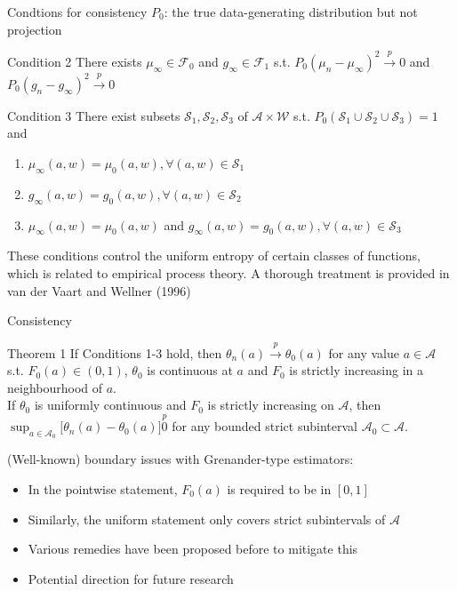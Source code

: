 \documentclass{beamer}
\newcommand{\vs}[1]{\vspace{#1 cm}}
\begin{document}
\begin{frame}{Condtions for consistency}
  $P_0$: the true data-generating distribution but not projection
  \begin{block}{Condition 2}
    There exists $\mu_\infty \in \mathcal{F}_0$ and $g_\infty \in \mathcal{F}_1$ s.t. $P_0(\mu_n -\mu_\infty)^2 \stackrel{p}{\rightarrow} 0$ and $P_0(g_n -g_\infty)^2 \stackrel{p}{\rightarrow} 0$
  \end{block}
  \begin{block}{Condition 3}
    There exist subsets $\mathcal{S}_1, \mathcal{S}_2, \mathcal{S}_3$ of $\mathcal{A} \times \mathcal{W}$ s.t. $P_0(\mathcal{S}_1 \cup \mathcal{S}_2 \cup \mathcal{S}_3)=1$ and
    \begin{enumerate}
      \item $\mu_\infty(a,w) = \mu_0(a,w), \forall (a,w) \in \mathcal{S}_1$
      \item $g_\infty(a,w) = g_0(a,w), \forall (a,w) \in \mathcal{S}_2$
      \item $\mu_\infty(a,w) = \mu_0(a,w)$ and $g_\infty(a,w) = g_0(a,w), \forall (a,w) \in \mathcal{S}_3$
    \end{enumerate}
  \end{block}
  These conditions control the uniform entropy of certain classes of functions, which is related to empirical process theory. A thorough treatment is provided in van der Vaart and Wellner (1996)
\end{frame}

\begin{frame}{Consistency}
  \begin{block}{Theorem 1}
    If Conditions 1-3 hold, then $\theta_n(a) \stackrel{p}{\rightarrow} \theta_0(a)$ for any value $a \in \mathcal{A}$ s.t. $F_0(a) \in (0,1)$, $\theta_0$ is continuous at $a$ and $F_0$ is strictly increasing in a neighbourhood of $a$. \\
    \vs{0.3}
    If $\theta_0$ is uniformly continuous and $F_0$ is strictly increasing on $\mathcal{A}$, then $\sup_{a \in \mathcal{A}_0} \big[ \theta_n(a) -\theta_0(a) \big] \stackrel{p} 0$ for any bounded strict subinterval $\mathcal{A}_0 \subset \mathcal{A}$.
  \end{block}
  (Well-known) boundary issues with Grenander-type estimators:
  \begin{itemize}
    \item In the pointwise statement, $F_0(a)$ is required to be in $[0,1]$
    \item Similarly, the uniform statement only covers strict subintervals of $\mathcal{A}$
    \item Various remedies have been proposed before to mitigate this
    \item Potential direction for future research
  \end{itemize}
\end{frame}
\end{document}
